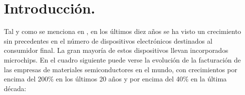 \section{Introducción.}

Tal y como se menciona en , en los últimos diez años se ha visto un crecimiento sin 
precedentes en el número de dispositivos electrónicos destinados al consumidor final. La gran mayoría de estos dispositivos llevan incorporados microchips. En el cuadro siguiente puede verse la evolución de la facturación de las empresas de materiales semiconductores en el mundo, con crecimientos por encima del 200\% en los últimos 20 años y por encima del 40\% en la última década:


